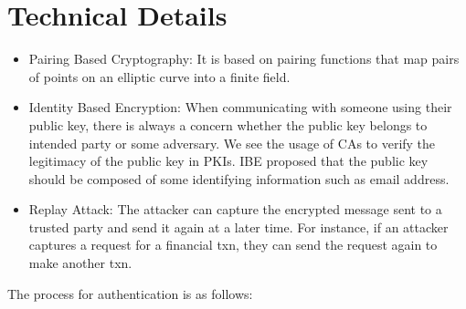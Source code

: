 \documentclass[]{article}   %
\begin{document}
\section*{Technical Details}
\begin{itemize}
    \item Pairing Based Cryptography: It is based on pairing functions that map pairs of points on an elliptic curve into a finite field.
    \item Identity Based Encryption: When communicating with someone using their public key, there is always a concern whether the public key belongs to intended party or some adversary. We see the usage of CAs to verify the legitimacy of the public key in PKIs. IBE proposed that the public key should be composed of some identifying information such as email address. 
    \item  Replay Attack: The attacker can capture the encrypted message sent to a trusted party and send it again at a later time. For instance, if an attacker captures a request for a financial txn, they can send the request again to make another txn. 
\end{itemize}
The process for authentication is as follows: 
\end{document}
